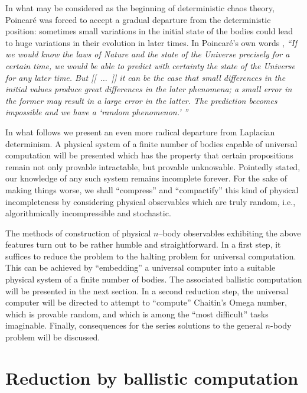 \documentclass{ws-rv9x6}
\begin{document}
In what may be considered as the beginning of deterministic chaos theory,
Poincar{\'e} was forced to accept a gradual departure from the deterministic position:
sometimes small
variations in the initial state of the bodies could lead to huge variations in their
evolution in later times.
In Poincar{\'e}'s own words  \cite[Chapter 4, Sect. II, pp. 56-57]{poincare14},
{\em
``If we would know the laws of Nature and the state of the Universe precisely
for a certain time,
we would be able to predict with certainty
the state of the Universe for any later time.
But
[[~$\ldots$~]]
it can be the case that small differences in the initial values
produce great differences in the later phenomena;
a small error in the former may result in a large error in the latter.
The prediction becomes impossible and we have a `random phenomenon.'
''}


In what follows we present an even more radical departure from Laplacian determinism.
A physical system of a finite number of bodies capable of universal computation will be presented
which has the property that certain propositions remain not only provable
intractable, but provable unknowable.
Pointedly stated, our knowledge of any such system remains incomplete forever.
For the sake of making things worse, we shall ``compress'' and ``compactify''
this kind of physical incompleteness by considering physical observables
which are truly random, i.e., algorithmically incompressible and stochastic.

The methods of construction of
physical $n$--body observables exhibiting the above features turn out to be rather humble and straightforward.
In a first step, it suffices to reduce the problem to the halting problem for universal computation.
This can be achieved by ``embedding'' a universal computer into a
suitable physical system of a finite number of bodies.
The associated ballistic computation will be presented in the next section.
In a second reduction step, the universal computer will be directed to attempt to ``compute''
Chaitin's Omega number, which is provable random,
and which is among the ``most difficult'' tasks imaginable.
Finally, consequences for the series solutions
 \cite{Sundman12,Wang91,Diacu96,Wang01} to the general $n$-body problem will be discussed.



\section{Reduction by ballistic computation}
\end{document}

